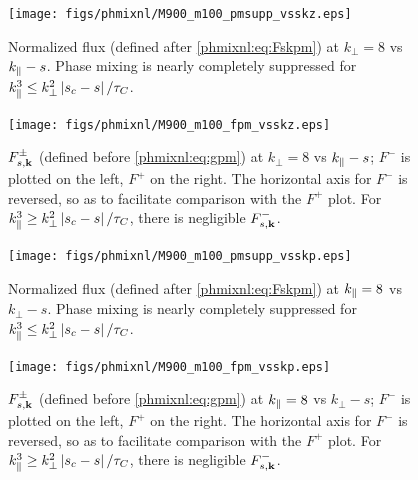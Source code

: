     \begin{figure}
    \begin{center}
        \texttt{[image: figs/phmixnl/M900\_m100\_pmsupp\_vsskz.eps]}
        \caption{Normalized flux (defined after \eqref{phmixnl:eq:Fskpm}) at $k_\perp=8$ vs
        $k_\parallel-s$. Phase mixing is nearly completely suppressed for $k_\parallel^3 \leq
        k_\perp^2 \left|s_c -s\right|/\tau_C$.}
        \label{phmixnl:fig:m100supp:vsskz}
    \end{center}
    \end{figure}
    \begin{figure}
    \begin{center}
        \texttt{[image: figs/phmixnl/M900\_m100\_fpm\_vsskz.eps]}
        \caption{$F_{s,\mathbf{k}}^\pm$ (defined before \eqref{phmixnl:eq:gpm}) at $k_\perp=8$ vs
        $k_\parallel-s$; $F^-$ is plotted on the left, $F^+$ on the right. The horizontal
        axis for $F^-$ is reversed, so as to facilitate comparison with the $F^+$
        plot. For $k_\parallel^3 \geq k_\perp^2 \left|s_c-s\right|/\tau_C$,
        there is negligible $F_{s,\mathbf{k}}^-$.}
        \label{phmixnl:fig:m100fpm:vsskz}
    \end{center}
    \end{figure}

    \begin{figure}
    \begin{center}
        \texttt{[image: figs/phmixnl/M900\_m100\_pmsupp\_vsskp.eps]}
        \caption{Normalized flux (defined after \eqref{phmixnl:eq:Fskpm}) at $k_\parallel=8$ vs
        $k_\perp-s$. Phase mixing is nearly completely suppressed for $k_\parallel^3 \leq
        k_\perp^2 \left|s_c -s\right|/\tau_C$.}
        \label{phmixnl:fig:m100supp:vsskp}
    \end{center}
    \end{figure}
    \begin{figure}
    \begin{center}
        \texttt{[image: figs/phmixnl/M900\_m100\_fpm\_vsskp.eps]}
        \caption{$F_{s,\mathbf{k}}^\pm$ (defined before \eqref{phmixnl:eq:gpm}) at $k_\parallel=8$ vs
        $k_\perp-s$; $F^-$ is plotted on the left, $F^+$ on the right. The horizontal
        axis for $F^-$ is reversed, so as to facilitate comparison with the $F^+$
        plot. For $k_\parallel^3 \geq k_\perp^2 \left|s_c-s\right|/\tau_C$,
        there is negligible $F_{s,\mathbf{k}}^-$.}
        \label{phmixnl:fig:m100fpm:vsskp}
    \end{center}
    \end{figure}


